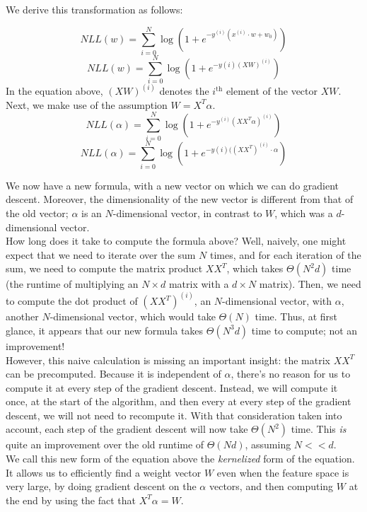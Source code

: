 \documentclass{sigchi}
\begin{document}
{We derive this transformation as follows:

$$NLL(w) = \sum_{i=0}^N \log(1+e^{-y^{(i)}(x^{(i)}\cdot w + w_0)}) $$
$$NLL(w) = \sum_{i=0}^N \log(1+e^{-y{(i)}(XW)^{(i)}})$$
In the equation above, $(XW)^{(i)}$ denotes the $i^{\textrm{th}}$ element of the vector $XW$. \\

Next, we make use of the assumption $W = X^T\alpha$.
$$NLL(\alpha) = \sum_{i=0}^N \log(1+e^{-y^{(i)}(XX^T\alpha)^{(i)}})$$
$$NLL(\alpha) = \sum_{i=0}^N \log(1+e^{-y{(i)}((XX^T)^{(i)} \cdot \alpha})$$

We now have a new formula, with a new vector on which we can do gradient descent. Moreover, the dimensionality of the new vector is different from that of the old vector; $\alpha$ is an $N$-dimensional vector, in contrast to $W$, which was a $d$-dimensional vector. \\

How long does it take to compute the formula above? Well, naively, one might expect that we need to iterate over the sum $N$ times, and for each iteration of the sum, we need to compute the matrix product $XX^T$, which takes $\Theta(N^2d)$ time (the runtime of multiplying an $N \times d$ matrix with a $d \times N$ matrix). Then, we need to compute the dot product of $(XX^T)^{(i)}$, an $N$-dimensional vector, with $\alpha$, another $N$-dimensional vector, which would take $\Theta(N)$ time. Thus, at first glance, it appears that our new formula takes $\Theta(N^3 d)$ time to compute; not an improvement! \\

However, this naive calculation is missing an important insight: the matrix $XX^T$ can be precomputed. Because it is independent of $\alpha$, there's no reason for us to compute it at every step of the gradient descent. Instead, we will compute it once, at the start of the algorithm, and then every at every step of the gradient descent, we will not need to recompute it. With that consideration taken into account, each step of the gradient descent will now take $\Theta(N^2)$ time. This \emph{is} quite an improvement over the old runtime of $\Theta(Nd)$, assuming $N << d$. \\

We call this new form of the equation above the \emph{kernelized} form of the equation. It allows us to efficiently find a weight vector $W$ even when the feature space is very large, by doing gradient descent on the $\alpha$ vectors, and then computing $W$ at the end by using the fact that $X^T\alpha = W$. \\

}
\end{document}
